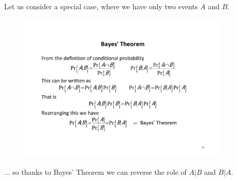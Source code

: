 \documentclass[notes=show, handout]{beamer}\usepackage[]{graphicx}\usepackage[]{color}
\newtheorem{aim}{Aim}[section]
\begin{document}
\begin{frame}{\secname}
  \begin{example}
  Let us consider a special case, where we have only two events $A$ and $B$.
  \begin{figure}[h!]
  \centering
  \includegraphics[width=0.9\textwidth,height=0.55\textheight]{img/example10.pdf}
  \end{figure}
  ... so thanks to Bayes' Theorem we can reverse the role of $A\vert B$ and $B \vert A$.
  \end{example}
\end{frame}

%
\end{document}

